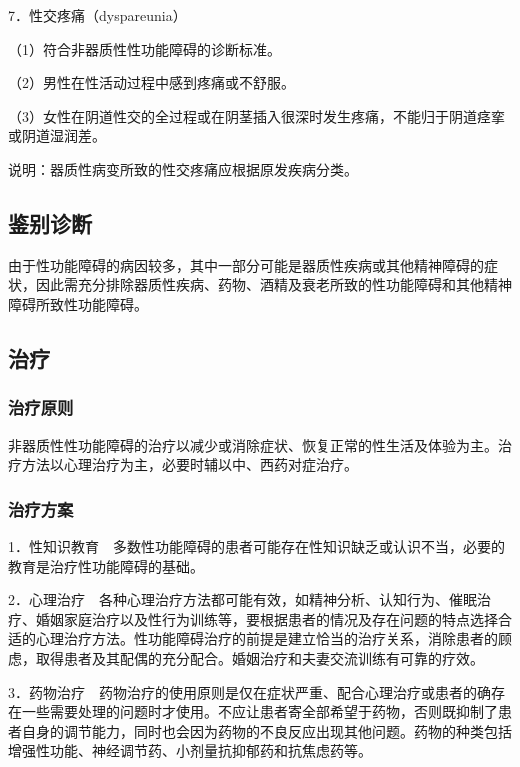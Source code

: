 7．性交疼痛（dyspareunia）

（1）符合非器质性性功能障碍的诊断标准。

（2）男性在性活动过程中感到疼痛或不舒服。

（3）女性在阴道性交的全过程或在阴茎插入很深时发生疼痛，不能归于阴道痉挛或阴道湿润差。

说明：器质性病变所致的性交疼痛应根据原发疾病分类。

\subsection{鉴别诊断}

由于性功能障碍的病因较多，其中一部分可能是器质性疾病或其他精神障碍的症状，因此需充分排除器质性疾病、药物、酒精及衰老所致的性功能障碍和其他精神障碍所致性功能障碍。

\subsection{治疗}

\subsubsection{治疗原则}

非器质性性功能障碍的治疗以减少或消除症状、恢复正常的性生活及体验为主。治疗方法以心理治疗为主，必要时辅以中、西药对症治疗。

\subsubsection{治疗方案}

1．性知识教育　多数性功能障碍的患者可能存在性知识缺乏或认识不当，必要的教育是治疗性功能障碍的基础。

2．心理治疗　各种心理治疗方法都可能有效，如精神分析、认知行为、催眠治疗、婚姻家庭治疗以及性行为训练等，要根据患者的情况及存在问题的特点选择合适的心理治疗方法。性功能障碍治疗的前提是建立恰当的治疗关系，消除患者的顾虑，取得患者及其配偶的充分配合。婚姻治疗和夫妻交流训练有可靠的疗效。

3．药物治疗　药物治疗的使用原则是仅在症状严重、配合心理治疗或患者的确存在一些需要处理的问题时才使用。不应让患者寄全部希望于药物，否则既抑制了患者自身的调节能力，同时也会因为药物的不良反应出现其他问题。药物的种类包括增强性功能、神经调节药、小剂量抗抑郁药和抗焦虑药等。